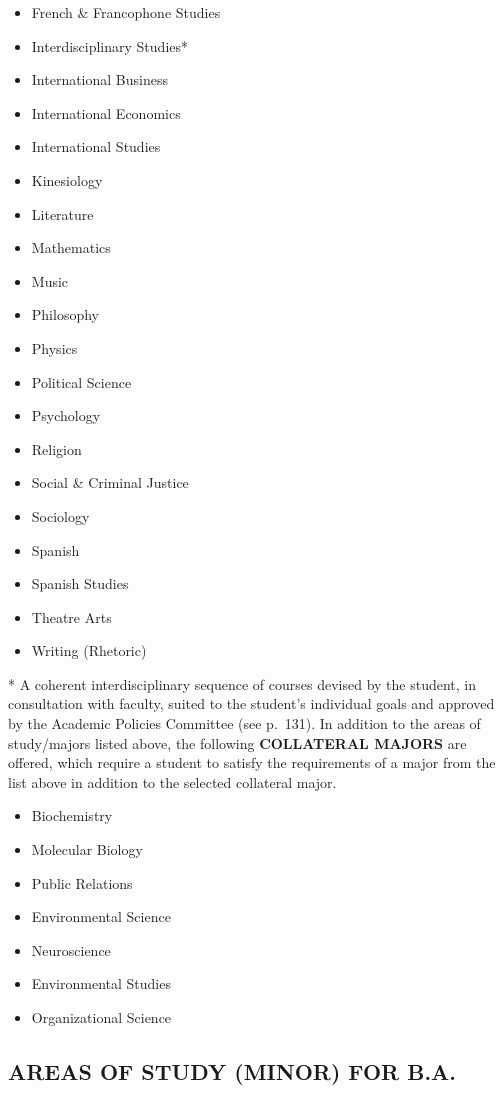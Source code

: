 \documentclass[
  letterpaper,
]{scrbook}
\providecommand{\tightlist}{%
  \setlength{\itemsep}{0pt}\setlength{\parskip}{0pt}}
\begin{document}
\begin{itemize}
\tightlist
\item
  French \& Francophone Studies
\item
  Interdisciplinary Studies*
\item
  International Business
\item
  International Economics
\item
  International Studies
\item
  Kinesiology
\item
  Literature
\item
  Mathematics
\item
  Music
\item
  Philosophy
\item
  Physics
\item
  Political Science
\item
  Psychology
\item
  Religion
\item
  Social \& Criminal Justice
\item
  Sociology
\item
  Spanish
\item
  Spanish Studies
\item
  Theatre Arts
\item
  Writing (Rhetoric)
\end{itemize}

* A coherent interdisciplinary sequence of courses devised by the
student, in consultation with faculty, suited to the student's
individual goals and approved by the Academic Policies Committee (see
p.~131). In addition to the areas of study/majors listed above, the
following \textbf{COLLATERAL MAJORS} are offered, which require a
student to satisfy the requirements of a major from the list above in
addition to the selected collateral major.

\begin{itemize}
\tightlist
\item
  Biochemistry
\item
  Molecular Biology
\item
  Public Relations
\item
  Environmental Science
\item
  Neuroscience
\item
  Environmental Studies
\item
  Organizational Science
\end{itemize}

\hypertarget{areas-of-study-minor-for-b.a.}{%
\subsection{AREAS OF STUDY (MINOR) FOR
B.A.}\label{areas-of-study-minor-for-b.a.}}
\end{document}

